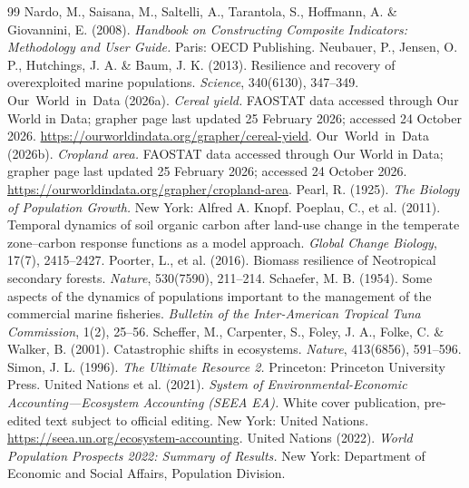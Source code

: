 \begin{thebibliography}{99}
 Nardo, M., Saisana, M., Saltelli, A., Tarantola, S., Hoffmann, A. \& Giovannini, E. (2008). \emph{Handbook on Constructing Composite Indicators: Methodology and User Guide.} Paris: OECD Publishing.
 Neubauer, P., Jensen, O. P., Hutchings, J. A. \& Baum, J. K. (2013). Resilience and recovery of overexploited marine populations. \emph{Science}, 340(6130), 347--349.
 Our~World~in~Data (2026a). \emph{Cereal yield.} FAOSTAT data accessed through Our World in Data; grapher page last updated 25 February 2026; accessed 24 October 2026. \url{https://ourworldindata.org/grapher/cereal-yield}.
 Our~World~in~Data (2026b). \emph{Cropland area.} FAOSTAT data accessed through Our World in Data; grapher page last updated 25 February 2026; accessed 24 October 2026. \url{https://ourworldindata.org/grapher/cropland-area}.
 Pearl, R. (1925). \emph{The Biology of Population Growth.} New York: Alfred A. Knopf.
 Poeplau, C., et al. (2011). Temporal dynamics of soil organic carbon after land-use change in the temperate zone--carbon response functions as a model approach. \emph{Global Change Biology}, 17(7), 2415--2427.
 Poorter, L., et al. (2016). Biomass resilience of Neotropical secondary forests. \emph{Nature}, 530(7590), 211--214.
 Schaefer, M. B. (1954). Some aspects of the dynamics of populations important to the management of the commercial marine fisheries. \emph{Bulletin of the Inter-American Tropical Tuna Commission}, 1(2), 25--56.
 Scheffer, M., Carpenter, S., Foley, J. A., Folke, C. \& Walker, B. (2001). Catastrophic shifts in ecosystems. \emph{Nature}, 413(6856), 591--596.
 Simon, J. L. (1996). \emph{The Ultimate Resource 2.} Princeton: Princeton University Press.
 United Nations et al. (2021). \emph{System of Environmental-Economic Accounting---Ecosystem Accounting (SEEA EA).} White cover publication, pre-edited text subject to official editing. New York: United Nations. \url{https://seea.un.org/ecosystem-accounting}.
 United Nations (2022). \emph{World Population Prospects 2022: Summary of Results.} New York: Department of Economic and Social Affairs, Population Division.

\end{thebibliography}
